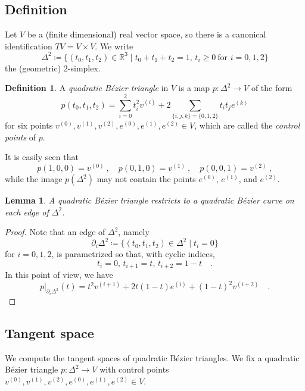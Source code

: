 \documentclass[pdftex,a4paper,12pt]{scrartcl}
\theoremstyle{plain}
\newtheorem{lemma}[theorem]{Lemma}
\theoremstyle{definition}
\newtheorem{definition}{Definition}
\theoremstyle{remark}
\numberwithin{equation}{section}
\begin{document}
\subsection{Definition}

Let $V$ be a (finite dimensional) real vector space, so there is a canonical identification $TV=V\times V$.
We write
\[
\Delta^2\coloneqq\{(t_0,t_1,t_2)\in\mathbb R^3\mid t_0+t_1+t_2=1,\,t_i\ge0\ \text{for $i=0,1,2$}\}
\]
the (geometric) $2$-simplex.

\begin{definition}
A \emph{quadratic B\'ezier triangle} in $V$ is a map $p:\Delta^2\to V$ of the form
\[
p(t_0,t_1,t_2)
= \sum_{i=0}^2 t_i^2 v^{(i)}+2\sum_{\{i,j,k\}=\{0,1,2\}} t_i t_je^{(k)}
\]
for six points $v^{(0)},v^{(1)},v^{(2)},e^{(0)},e^{(1)},e^{(2)}\in V$, which are called the \emph{control points} of $p$.
\end{definition}

It is easily seen that
\[
p(1,0,0) = v^{(0)}
\ ,\quad p(0,1,0) = v^{(1)}
\ ,\quad p(0,0,1) = v^{(2)}
\ ,
\]
while the image $p(\Delta^2)$ may not contain the points $e^{(0)}$, $e^{(1)}$, and $e^{(2)}$.

\begin{lemma}
A quadratic B\'ezier triangle restricts to a quadratic B\'ezier curve on each edge of $\Delta^2$.
\end{lemma}
\begin{proof}
Note that an edge of $\Delta^2$, namely
\[
\partial_i\Delta^2\coloneqq \{(t_0,t_1,t_2)\in\Delta^2\mid t_i=0\}
\]
for $i=0,1,2$, is parametrized so that, with cyclic indices,
\[
t_i=0
,\,
t_{i+1}=t
,\,
t_{i+2}=1-t
\quad.
\]
In this point of view, we have
\[
\left.p\right|_{\partial_i\Delta^2}(t)
= t^2v^{(i+1)} + 2t(1-t) e^{(i)} + (1-t)^2 v^{(i+2)}
\quad.
\]
\end{proof}

\subsection{Tangent space}
\label{sec:Beztri:tangent}

We compute the tangent spaces of quadratic B\'ezier triangles.
We fix a quadratic B\'ezier triangle $p:\Delta^2\to V$ with control points $v^{(0)},v^{(1)},v^{(2)},e^{(0)},e^{(1)},e^{(2)}\in V$.
\end{document}
